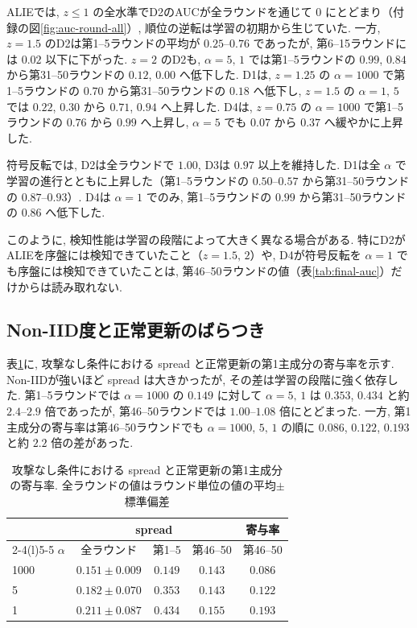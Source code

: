 \documentclass[a4j, twocolumn, dvipdfmx]{jsarticle}
\newcommand{\Spread}{\textrm{spread}}
\begin{document}
ALIEでは, $z \le 1$ の全水準でD2のAUCが全ラウンドを通じて $0$ にとどまり（付録の図\ref{fig:auc-round-all}）, 順位の逆転は学習の初期から生じていた. 一方, $z=1.5$ のD2は第1--5ラウンドの平均が $0.25$--$0.76$ であったが, 第6--15ラウンドには $0.02$ 以下に下がった. $z=2$ のD2も, $\alpha=5,\,1$ では第1--5ラウンドの $0.99$, $0.84$ から第31--50ラウンドの $0.12$, $0.00$ へ低下した. D1は, $z=1.25$ の $\alpha=1000$ で第1--5ラウンドの $0.70$ から第31--50ラウンドの $0.18$ へ低下し, $z=1.5$ の $\alpha=1,\,5$ では $0.22$, $0.30$ から $0.71$, $0.94$ へ上昇した. D4は, $z=0.75$ の $\alpha=1000$ で第1--5ラウンドの $0.76$ から $0.99$ へ上昇し, $\alpha=5$ でも $0.07$ から $0.37$ へ緩やかに上昇した.

符号反転では, D2は全ラウンドで $1.00$, D3は $0.97$ 以上を維持した. D1は全 $\alpha$ で学習の進行とともに上昇した（第1--5ラウンドの $0.50$--$0.57$ から第31--50ラウンドの $0.87$--$0.93$）. D4は $\alpha=1$ でのみ, 第1--5ラウンドの $0.99$ から第31--50ラウンドの $0.86$ へ低下した.

このように, 検知性能は学習の段階によって大きく異なる場合がある. 特にD2がALIEを序盤には検知できていたこと（$z=1.5,\,2$）や, D4が符号反転を $\alpha=1$ でも序盤には検知できていたことは, 第46--50ラウンドの値（表\ref{tab:final-auc}）だけからは読み取れない.

\subsection{Non-IID度と正常更新のばらつき}
\label{sec:res-spread}

表\ref{tab:spread}に, 攻撃なし条件における \Spread{} と正常更新の第1主成分の寄与率を示す. Non-IIDが強いほど \Spread{} は大きかったが, その差は学習の段階に強く依存した. 第1--5ラウンドでは $\alpha=1000$ の $0.149$ に対して $\alpha=5,\,1$ は $0.353$, $0.434$ と約 $2.4$--$2.9$ 倍であったが, 第46--50ラウンドでは $1.00$--$1.08$ 倍にとどまった. 一方, 第1主成分の寄与率は第46--50ラウンドでも $\alpha=1000,\,5,\,1$ の順に $0.086$, $0.122$, $0.193$ と約 $2.2$ 倍の差があった.

\begin{table}[t]
\centering
\caption{攻撃なし条件における \Spread{} と正常更新の第1主成分の寄与率. 全ラウンドの値はラウンド単位の値の平均$\pm$標準偏差}
\label{tab:spread}
\small
\begin{tabular}{@{}lcccc@{}}
\toprule
 & \multicolumn{3}{c}{\Spread{}} & 寄与率 \\
\cmidrule(lr){2-4}\cmidrule(l){5-5}
$\alpha$ & 全ラウンド & 第1--5 & 第46--50 & 第46--50 \\
\midrule
1000 & $0.151 \pm 0.009$ & $0.149$ & $0.143$ & $0.086$ \\
5    & $0.182 \pm 0.070$ & $0.353$ & $0.143$ & $0.122$ \\
1    & $0.211 \pm 0.087$ & $0.434$ & $0.155$ & $0.193$ \\
\bottomrule
\end{tabular}
\end{table}
\end{document}
